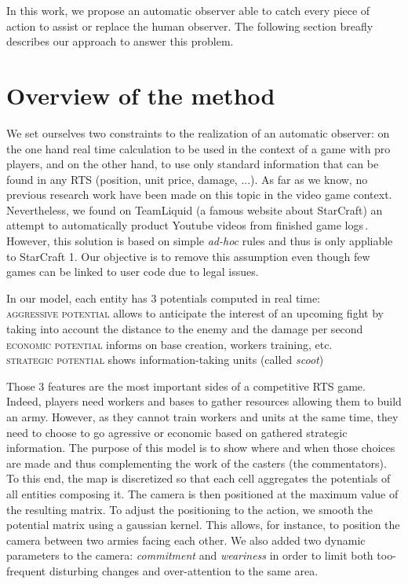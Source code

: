 \documentclass{jfsma}
\begin{document}
    In this work, we propose an automatic observer able to catch every piece of action to assist or replace the human observer. The following section breafly describes our approach to answer this problem.

\section{Overview of the method}
We set ourselves two constraints to the realization of an automatic observer: on the one hand real time calculation to be used in the context of a game with pro players, and on the other hand, to use only standard information that can be found in any RTS (position, unit price, damage, ...).
As far as we know, no previous research work have been made on this topic in the video game context.
Nevertheless, we found on TeamLiquid (a famous website about StarCraft) an attempt to automatically product Youtube videos from finished game logs\,\cite{tl}.
However, this solution is based on simple \emph{ad-hoc} rules and thus is only appliable to StarCraft 1.
Our objective is to remove this assumption even though few games can be linked to user code due to legal issues.

In our model, each entity has 3 potentials computed in real time:\\
\textsc{aggressive potential} allows to anticipate the interest of an upcoming fight by taking into account the distance to the enemy and the damage per second\\
\textsc{economic potential} informs on base creation, workers training, etc.\\
\textsc{strategic potential} shows information-taking units (called \emph{scoot})

Those 3 features are the most important sides of a competitive RTS game.
Indeed, players need workers and bases to gather resources allowing them to build an army.
However, as they cannot train workers and units at the same time, they need to choose to go agressive or economic based on gathered strategic information.
The purpose of this model is to show where and when those choices are made and thus complementing the work of the casters (the commentators).
To this end, the map is discretized so that each cell aggregates the potentials of all entities composing it.
The camera is then positioned at the maximum value of the resulting matrix.
To adjust the positioning to the action, we smooth the potential matrix using a gaussian kernel.
This allows, for instance, to position the camera between two armies facing each other.
We also added two dynamic parameters to the camera: \emph{commitment} and \emph{weariness} in order to limit both too-frequent disturbing changes and over-attention to the same area.
\end{document}

